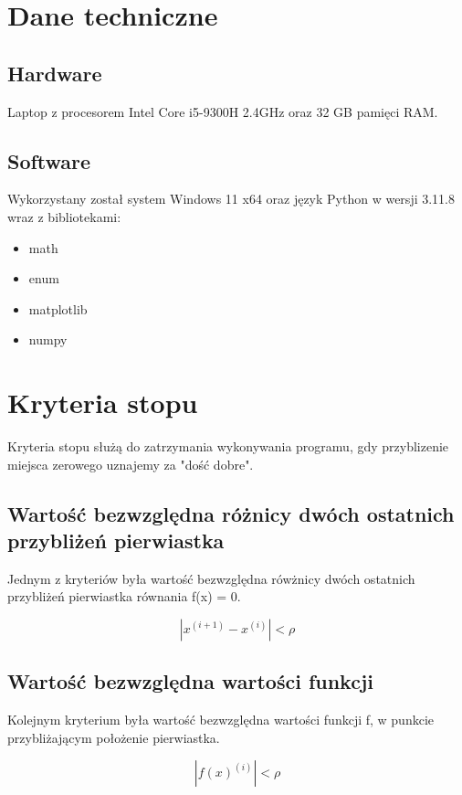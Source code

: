 \documentclass{article}
\begin{document}
\section{Dane techniczne}

\subsection{Hardware}

Laptop z procesorem Intel Core i5-9300H 2.4GHz oraz 32 GB pamięci RAM.

\subsection{Software}

Wykorzystany został system Windows 11 x64 oraz język Python w wersji 3.11.8 wraz z bibliotekami:
\begin{itemize}
\item math
\item enum
\item matplotlib
\item numpy
\end{itemize}

\section{Kryteria stopu}

Kryteria stopu służą do zatrzymania wykonywania programu, gdy przyblizenie miejsca zerowego uznajemy za "dość dobre".

\subsection{Wartość bezwzględna różnicy dwóch ostatnich przybliżeń pierwiastka}

Jednym z kryteriów była wartość bezwzględna rówżnicy dwóch ostatnich przybliżeń pierwiastka równania f(x) = 0.

\[|x^{(i + 1)} - x^{(i)}| < \rho\]

\subsection{Wartość bezwzględna wartości funkcji}

Kolejnym kryterium była wartość bezwzględna wartości funkcji f, w punkcie przybliżającym położenie pierwiastka.

\[|f(x)^{(i)}| < \rho\]
\end{document}
